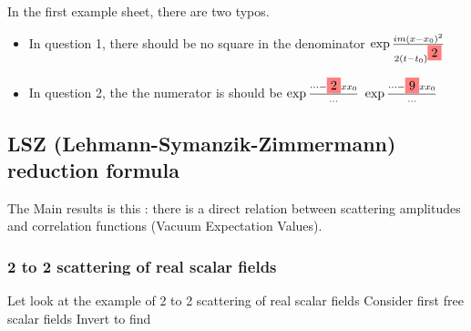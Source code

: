 \documentclass{article}
\begin{document}
\begin{remark}
In the first example sheet, there are two typos. 
\begin{itemize}
    \item In question 1, there should be no square in the denominator $\exp \frac{im(x-x_0)^2}{2(t-t_0)^{\highlight{2}}}$
    \item In question 2, the the numerator is should be $\exp\frac{\dots -\highlight{2}xx_0}{\dots}$  $\exp\frac{\dots -\highlight{9}xx_0}{\dots}$ 
\end{itemize}
\end{remark}


\subsection{LSZ (Lehmann-Symanzik-Zimmermann) reduction formula}

\begin{remark}
The Main results is this : there is a direct relation between scattering amplitudes and correlation functions (Vacuum Expectation Values). 
\end{remark}

\subsubsection*{2 to 2 scattering of real scalar fields}
Let look at the example of 2 to 2 scattering of real scalar fields
Consider first free scalar fields 
Invert to find 
\end{document}
